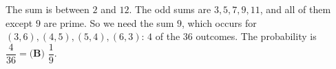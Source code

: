 The sum is between $2$ and $12$. The odd sums are $3,5,7,9,11$, and all of them except $9$ are prime. So we need the sum $9$, which occurs for $(3,6),(4,5),(5,4),(6,3)$: $4$ of the $36$ outcomes. The probability is $\dfrac4{36}=\boxed{\textbf{(B) }\dfrac19}$.
